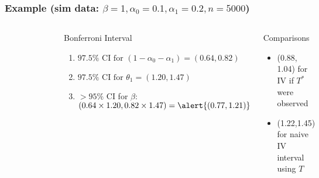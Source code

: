 \documentclass[handout]{beamer}
\begin{document}
%
%  
\begin{frame}
  \frametitle{Example \hfill \small{(sim data: $\beta = 1, \alpha_0 = 0.1, \alpha_1 = 0.2, n = 5000$)}}

\begin{columns}
  \vspace{-2em}
\begin{figure}[h]
  \centering
\resizebox{\textwidth}{!}{%
  
}
\end{figure}
  \scriptsize
  \pause
  \begin{alertblock}{\small Bonferroni Interval}
  \begin{enumerate}
    \item $97.5\% \mbox{ CI for } (1 - \alpha_0 - \alpha_1) = (0.64, 0.82)$
      \pause
    \item $97.5\% \mbox{ CI for } \theta_1 = (1.20, 1.47)$ 
      \pause
    \item $> 95\%$ CI for $\beta$: \\
      $(0.64 \times 1.20, 0.82 \times 1.47) = \alert{(0.77,1.21)} $
  \end{enumerate}
    \end{alertblock}
\pause
  \begin{block}{\small Comparisons}
    \begin{itemize}
      \item (0.88, 1.04) for IV if $T^*$ were observed
      \item (1.22,1.45) for naive IV interval using $T$
    \end{itemize}
\end{block}

\end{columns}
\end{frame}
\end{document}
